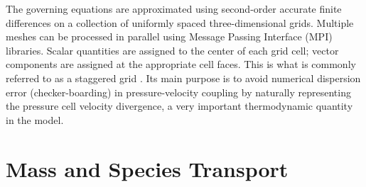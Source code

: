 The governing equations are approximated using second-order accurate finite differences on a collection of uniformly spaced three-dimensional grids. Multiple meshes can be processed in parallel using Message Passing Interface (MPI) libraries. Scalar quantities are assigned to the center of each grid cell; vector components are assigned at the appropriate cell faces. This is what is commonly referred to as a staggered grid \cite{Harlow:1}.  Its main purpose is to avoid numerical dispersion error (checker-boarding) in pressure-velocity coupling by naturally representing the pressure cell velocity divergence, a very important thermodynamic quantity in the model.

\section{Mass and Species Transport}

